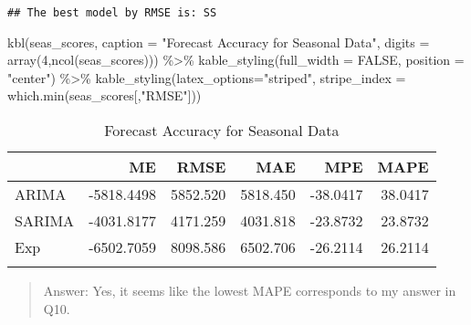 \documentclass[
]{article}
\newenvironment{Shaded}{\begin{snugshade}}{\end{snugshade}}
\newcommand{\AttributeTok}[1]{\textcolor[rgb]{0.77,0.63,0.00}{#1}}
\newcommand{\ConstantTok}[1]{\textcolor[rgb]{0.00,0.00,0.00}{#1}}
\newcommand{\DecValTok}[1]{\textcolor[rgb]{0.00,0.00,0.81}{#1}}
\newcommand{\FunctionTok}[1]{\textcolor[rgb]{0.00,0.00,0.00}{#1}}
\newcommand{\NormalTok}[1]{#1}
\newcommand{\SpecialCharTok}[1]{\textcolor[rgb]{0.00,0.00,0.00}{#1}}
\newcommand{\StringTok}[1]{\textcolor[rgb]{0.31,0.60,0.02}{#1}}
\begin{document}
\begin{verbatim}
## The best model by RMSE is: SS
\end{verbatim}

\begin{Shaded}
\begin{Highlighting}[]
\FunctionTok{kbl}\NormalTok{(seas\_scores, }\AttributeTok{caption =} \StringTok{"Forecast Accuracy for Seasonal Data"}\NormalTok{, }\AttributeTok{digits =} \FunctionTok{array}\NormalTok{(}\DecValTok{4}\NormalTok{,}\FunctionTok{ncol}\NormalTok{(seas\_scores))) }\SpecialCharTok{\%\textgreater{}\%} 
  \FunctionTok{kable\_styling}\NormalTok{(}\AttributeTok{full\_width =} \ConstantTok{FALSE}\NormalTok{, }\AttributeTok{position =} \StringTok{"center"}\NormalTok{) }\SpecialCharTok{\%\textgreater{}\%}
  \FunctionTok{kable\_styling}\NormalTok{(}\AttributeTok{latex\_options=}\StringTok{"striped"}\NormalTok{, }\AttributeTok{stripe\_index =} \FunctionTok{which.min}\NormalTok{(seas\_scores[,}\StringTok{"RMSE"}\NormalTok{]))}
\end{Highlighting}
\end{Shaded}

\begin{table}

\caption{\label{tab:unnamed-chunk-11}Forecast Accuracy for Seasonal Data}
\centering
\begin{tabular}[t]{l|r|r|r|r|r}
\hline
  & ME & RMSE & MAE & MPE & MAPE\\
\hline
ARIMA & -5818.4498 & 5852.520 & 5818.450 & -38.0417 & 38.0417\\
\hline
SARIMA & -4031.8177 & 4171.259 & 4031.818 & -23.8732 & 23.8732\\
\hline
Exp & -6502.7059 & 8098.586 & 6502.706 & -26.2114 & 26.2114\\
\hline
\cellcolor{gray!6}{SS} & \cellcolor{gray!6}{-106.3944} & \cellcolor{gray!6}{1332.997} & \cellcolor{gray!6}{1076.021} & \cellcolor{gray!6}{0.6930} & \cellcolor{gray!6}{5.6184}\\
\hline
\end{tabular}
\end{table}

\begin{quote}
Answer: Yes, it seems like the lowest MAPE corresponds to my answer in
Q10.
\end{quote}
\end{document}
